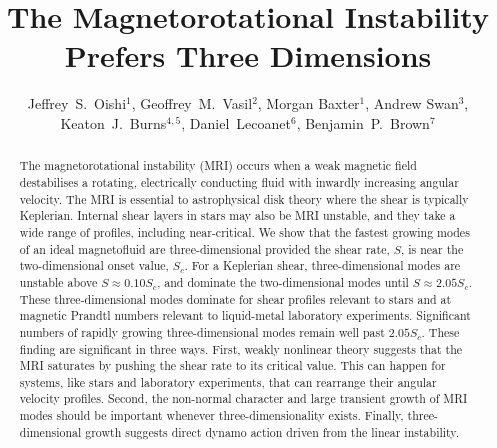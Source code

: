 \documentclass{rsproca_new}%
\begin{document}
\title{The Magnetorotational Instability Prefers Three Dimensions}

\author{%
Jeffrey~S.~Oishi$^{1}$, Geoffrey~M.~Vasil$^{2}$, Morgan Baxter$^{1}$,
Andrew Swan$^{3}$, Keaton~J.~Burns$^{4,5}$, Daniel~Lecoanet$^6$, Benjamin~P.~Brown$^7$}

\address{$^{1}$Bates College, Lewiston, ME 04240, USA\\
$^{2}$University of Sydney, Sydney, NSW, Australia\\
$^{3}$University of Cambridge, Cambridge,
UK\\
$^{4}$Flatiron Institute, New York, NY 10010, USA\\
$^{5}$MIT, Cambridge, MA 02139, USA\\
$^{6}$Princeton University, Princeton, NJ 08544, USA\\
$^{7}$University of Colorado, CO 80309, USA}

\begin{abstract}
The magnetorotational instability (MRI) occurs when a weak magnetic field destabilises a rotating, electrically conducting fluid with inwardly increasing angular velocity.
The MRI is essential to astrophysical disk theory where the shear is typically Keplerian.
Internal shear layers in stars may also be MRI unstable, and they take a wide range of profiles, including near-critical.
We show that the fastest growing modes of an ideal magnetofluid are three-dimensional provided the shear rate, $S$, is near the two-dimensional onset value, $S_c$.
For a Keplerian shear, three-dimensional modes are unstable above $S\approx0.10S_c$, and dominate the two-dimensional modes until $S\approx2.05S_{c}$.
These three-dimensional modes dominate for shear profiles relevant to stars and at magnetic Prandtl numbers relevant to liquid-metal laboratory experiments.
Significant numbers of rapidly growing three-dimensional modes remain well past $2.05S_{c}$. 
These finding are significant in three ways. 
First, weakly nonlinear theory suggests that the MRI saturates by pushing the shear rate to its critical value. 
This can happen for systems, like stars and laboratory experiments, that can rearrange their angular velocity profiles.
Second, the non-normal character and large transient growth of MRI modes should be important whenever three-dimensionality exists.
Finally, three-dimensional growth suggests direct dynamo action driven from the linear instability.
\end{abstract}
\end{document}
